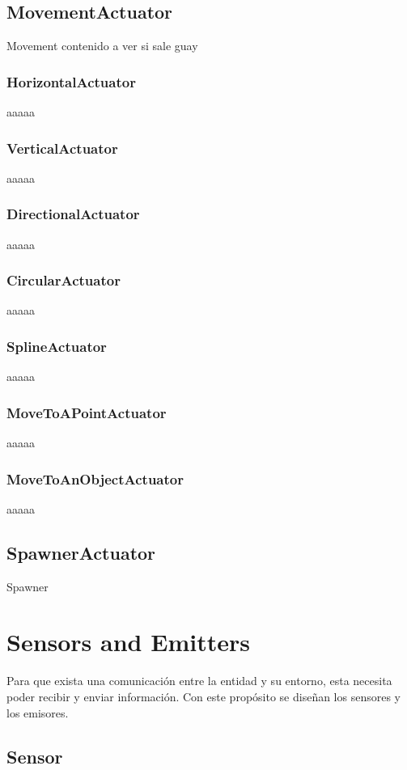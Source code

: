 \subsection{MovementActuator}
Movement contenido a ver si sale guay
\subsubsection{HorizontalActuator}
aaaaa
\subsubsection{VerticalActuator}
aaaaa
\subsubsection{DirectionalActuator}
aaaaa
\subsubsection{CircularActuator}
aaaaa
\subsubsection{SplineActuator}
aaaaa
\subsubsection{MoveToAPointActuator}
aaaaa
\subsubsection{MoveToAnObjectActuator}
aaaaa

\subsection{SpawnerActuator}
Spawner

\section{Sensors and Emitters}

Para que exista una comunicación entre la entidad y su entorno, esta necesita poder recibir y enviar información. Con este propósito se diseñan los sensores y los emisores.\\

\subsection{Sensor}

